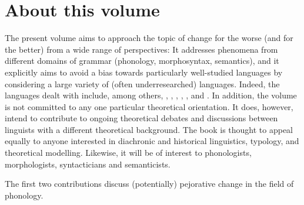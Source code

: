 \documentclass[output=paper,hidelinks]{langscibook}
\begin{document}
\section*{About this volume}

The present volume aims to approach the topic of change for the worse (and for the better) from a wide range of perspectives: It addresses phenomena from different domains of grammar (phonology, morphosyntax, semantics), and it explicitly aims to avoid a bias towards particularly well-studied languages by considering a large variety of (often underresearched) languages. Indeed, the languages dealt with include, among others, , , ,  , ,  and . In addition, the volume is not committed to any one particular theoretical orientation. It does, however, intend  to contribute to ongoing theoretical debates and discussions between linguists with a different theoretical background. The book is thought to appeal equally to anyone interested in diachronic and historical linguistics, typology, and theoretical modelling. Likewise, it will be of interest to phonologists, morphologists, syntacticians and semanticists.

The first two contributions discuss (potentially) pejorative change in the field of phonology.
\end{document}
